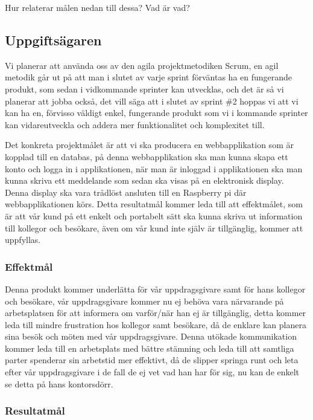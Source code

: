 \documentclass[11pt]{article}
\begin{document}
Hur relaterar målen nedan till dessa? Vad är vad?

\subsection{Uppgiftsägaren}
\label{sec:org5dda01a}
Vi planerar att använda oss av den agila projektmetodiken Scrum, en agil
metodik går ut på att man i slutet av varje sprint förväntas ha en
fungerande produkt, som sedan i vidkommande sprinter kan utvecklas, och
det är så vi planerar att jobba också, det vill säga att i slutet av
sprint \#2 hoppas vi att vi kan ha en, förvisso väldigt enkel, fungerande
produkt som vi i kommande sprinter kan vidareutveckla och addera mer
funktionalitet och komplexitet till.

Det konkreta projektmålet är att vi ska producera en webbapplikation som
är kopplad till en databas, på denna webbapplikation ska man kunna skapa
ett konto och logga in i applikationen, när man är inloggad i
applikationen ska man kunna skriva ett meddelande som sedan ska visas på
en elektronisk display. Denna display ska vara trådlöst ansluten till en
Raspberry pi där webbapplikationen körs. Detta resultatmål kommer leda
till att effektmålet, som är att vår kund på ett enkelt och portabelt
sätt ska kunna skriva ut information till kollegor och besökare, även om
vår kund inte själv är tillgänglig, kommer att uppfyllas.

\subsubsection{Effektmål}
\label{sec:orgf7f31cb}

Denna produkt kommer underlätta för vår uppdragsgivare samt för hans
kollegor och besökare, vår uppdragsgivare kommer nu ej behöva vara
närvarande på arbetsplatsen för att informera om varför/när han ej är
tillgänglig, detta kommer leda till mindre frustration hos kollegor samt
besökare, då de enklare kan planera sina besök och möten med vår
uppdragsgivare. Denna utökade kommunikation kommer leda till en
arbetsplats med bättre stämning och leda till att samtliga parter
spenderar sin arbetstid mer effektivt, då de slipper springa runt och
leta efter vår uppdragsgivare i de fall de ej vet vad han har för sig,
nu kan de enkelt se detta på hans kontorsdörr.

\subsubsection{Resultatmål}
\label{sec:org7f013dd}
\end{document}
